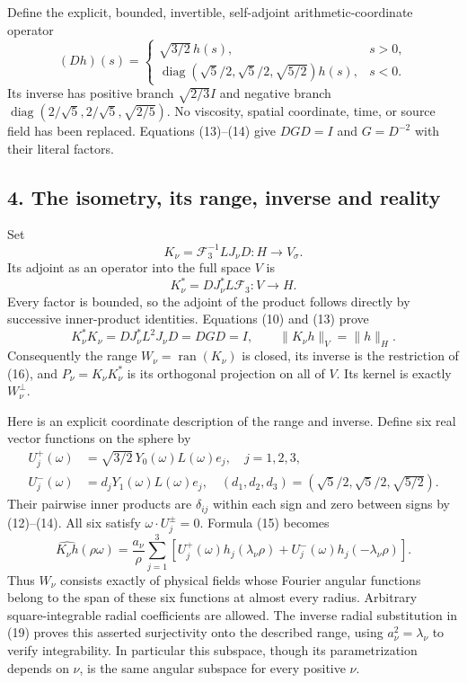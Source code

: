 Define the explicit, bounded, invertible, self-adjoint arithmetic-coordinate operator \[
(Dh)(s)=
\begin{cases}
\sqrt{3/2}\,h(s),&s>0,\\
\operatorname{diag}(\sqrt5/2,\sqrt5/2,\sqrt{5/2})h(s),&s<0.
\end{cases}
\tag{14}
\] Its inverse has positive branch \(\sqrt{2/3}I\) and negative branch \(\operatorname{diag}(2/\sqrt5,2/\sqrt5,\sqrt{2/5})\). No viscosity, spatial coordinate, time, or source field has been replaced. Equations (13)--(14) give \(DGD=I\) and \(G=D^{-2}\) with their literal factors.

\subsection*{4. The isometry, its range, inverse and reality}

Set \[
K_\nu=\mathcal F_3^{-1}LJ_\nu D:H\longrightarrow V_\sigma.
\tag{15}
\] Its adjoint as an operator into the full space \(V\) is \[
K_\nu^*=D J_\nu^*L\mathcal F_3:V\longrightarrow H.
\tag{16}
\] Every factor is bounded, so the adjoint of the product follows directly by successive inner-product identities. Equations (10) and (13) prove \[
K_\nu^*K_\nu=D J_\nu^*L^2J_\nu D=DGD=I,
\qquad\|K_\nu h\|_V=\|h\|_H.
\tag{17}
\] Consequently the range \(W_\nu=\operatorname{ran}(K_\nu)\) is closed, its inverse is the restriction of (16), and \(P_\nu=K_\nu K_\nu^*\) is its orthogonal projection on all of \(V\). Its kernel is exactly \(W_\nu^\perp\).

Here is an explicit coordinate description of the range and inverse. Define six real vector functions on the sphere by \[
\begin{aligned}
U_j^+(\omega)&=\sqrt{3/2}\,Y_0(\omega)L(\omega)e_j,\quad j=1,2,3,\\
U_j^-(\omega)&=d_jY_1(\omega)L(\omega)e_j,\quad
(d_1,d_2,d_3)=(\sqrt5/2,\sqrt5/2,\sqrt{5/2}).
\end{aligned}
\tag{18}
\] Their pairwise inner products are \(\delta_{ij}\) within each sign and zero between signs by (12)--(14). All six satisfy \(\omega\cdot U_j^\pm=0\). Formula (15) becomes \[
\widehat{K_\nu h}(\rho\omega)=\frac{a_\nu}{\rho}
\sum_{j=1}^3\left[U_j^+(\omega)h_j(\lambda_\nu\rho)
+U_j^-(\omega)h_j(-\lambda_\nu\rho)\right].
\tag{19}
\] Thus \(W_\nu\) consists exactly of physical fields whose Fourier angular functions belong to the span of these six functions at almost every radius. Arbitrary square-integrable radial coefficients are allowed. The inverse radial substitution in (19) proves this asserted surjectivity onto the described range, using \(a_\nu^2=\lambda_\nu\) to verify integrability. In particular this subspace, though its parametrization depends on \(\nu\), is the same angular subspace for every positive \(\nu\).

